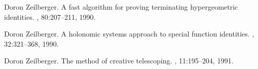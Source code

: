 \documentclass{jssc}
\begin{document}
\begin{thebibliography}{199}
Doron Zeilberger.
\newblock A fast algorithm for proving terminating hypergeometric identities.
, 80:207--211, 1990.

Doron Zeilberger.
\newblock A holonomic systems approach to special function identities.
, 32:321--368,
  1990.

Doron Zeilberger.
\newblock The method of creative telescoping.
, 11:195--204, 1991.

\end{thebibliography}
\end{document}
